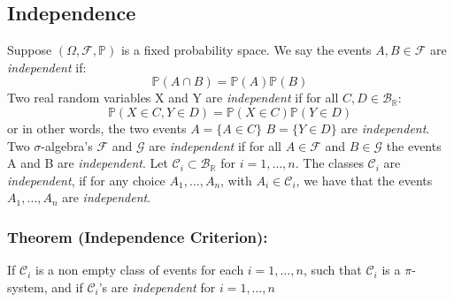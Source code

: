 \documentclass{article}
\begin{document}
\subsection{Independence}
Suppose $(\Omega, \mathcal{F},\mathbb{P})$ is a fixed probability space. We say the events $A, B \in \mathcal{F}$ are \emph{independent} if: \[
\mathbb{P}(A \cap B) = \mathbb{P}(A)\mathbb{P}(B)
\]
Two real random variables X and Y are \emph{independent} if for all $C,D\in\mathcal{B}_{\mathbb{R}}:$
\[
\mathbb{P}(X\in C,Y\in D)=\mathbb{P}(X\in C)\mathbb{P}(Y\in D)
\]
or in other words, the two events $A=\{A\in C\}$ $B=\{Y\in D\}$ are \emph{independent}.\newline \newline
Two $\sigma$-algebra's $\mathcal{F}$ and $\mathcal{G}$ are \emph{independent} if for all $A \in \mathcal{F}$ and $B \in \mathcal{G}$ the events A and B are \emph{independent}.\newline \newline
Let $\mathcal{C}_i\subset \mathcal{B}_{\mathbb{R}}$ for $i=1,\ldots,n$. The classes $\mathcal{C}_i$ are \emph{independent}, if for any choice $A_1,\ldots,A_n$, with $A_i\in\mathcal{C}_i$, we have that the events $A_1,\ldots,A_n$ are \emph{independent}.
\subsubsection{Theorem (Independence Criterion):}
If $\mathcal{C}_i$ is a non empty class of events for each $i=1,\ldots,n$, such that $\mathcal{C}_i$ is a $\pi$-system, and if $\mathcal{C}_i$'s are \emph{independent} for $i=1,\ldots,n$ 
\end{document}
